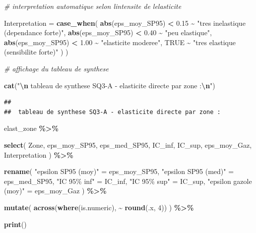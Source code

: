 \documentclass[
]{article}
\newenvironment{Shaded}{\begin{snugshade}}{\end{snugshade}}
\newcommand{\AttributeTok}[1]{\textcolor[rgb]{0.13,0.29,0.53}{#1}}
\newcommand{\CommentTok}[1]{\textcolor[rgb]{0.56,0.35,0.01}{\textit{#1}}}
\newcommand{\ConstantTok}[1]{\textcolor[rgb]{0.56,0.35,0.01}{#1}}
\newcommand{\DecValTok}[1]{\textcolor[rgb]{0.00,0.00,0.81}{#1}}
\newcommand{\FloatTok}[1]{\textcolor[rgb]{0.00,0.00,0.81}{#1}}
\newcommand{\FunctionTok}[1]{\textcolor[rgb]{0.13,0.29,0.53}{\textbf{#1}}}
\newcommand{\NormalTok}[1]{#1}
\newcommand{\OtherTok}[1]{\textcolor[rgb]{0.56,0.35,0.01}{#1}}
\newcommand{\SpecialCharTok}[1]{\textcolor[rgb]{0.81,0.36,0.00}{\textbf{#1}}}
\newcommand{\StringTok}[1]{\textcolor[rgb]{0.31,0.60,0.02}{#1}}
\begin{document}
\begin{Shaded}
\begin{Highlighting}[]
    \CommentTok{\# interpretation automatique selon l\textquotesingle{}intensite de l\textquotesingle{}elasticite}

    \AttributeTok{Interpretation =} \FunctionTok{case\_when}\NormalTok{(}
      \FunctionTok{abs}\NormalTok{(eps\_moy\_SP95) }\SpecialCharTok{\textless{}} \FloatTok{0.15} \SpecialCharTok{\textasciitilde{}} \StringTok{"tres inelastique (dependance forte)"}\NormalTok{,}
      \FunctionTok{abs}\NormalTok{(eps\_moy\_SP95) }\SpecialCharTok{\textless{}} \FloatTok{0.40} \SpecialCharTok{\textasciitilde{}} \StringTok{"peu elastique"}\NormalTok{,}
      \FunctionTok{abs}\NormalTok{(eps\_moy\_SP95) }\SpecialCharTok{\textless{}} \FloatTok{1.00} \SpecialCharTok{\textasciitilde{}} \StringTok{"elasticite moderee"}\NormalTok{,}
      \ConstantTok{TRUE} \SpecialCharTok{\textasciitilde{}} \StringTok{"tres elastique (sensibilite forte)"}
\NormalTok{    )}
\NormalTok{  )}


\CommentTok{\# affichage du tableau de synthese}

\FunctionTok{cat}\NormalTok{(}\StringTok{"}\SpecialCharTok{\textbackslash{}n}\StringTok{ tableau de synthese SQ3{-}A {-} elasticite directe par zone :}\SpecialCharTok{\textbackslash{}n}\StringTok{"}\NormalTok{)}
\end{Highlighting}
\end{Shaded}

\begin{verbatim}
## 
##  tableau de synthese SQ3-A - elasticite directe par zone :
\end{verbatim}

\begin{Shaded}
\begin{Highlighting}[]
\NormalTok{elast\_zone }\SpecialCharTok{\%\textgreater{}\%}

  \FunctionTok{select}\NormalTok{(}
\NormalTok{    Zone,}
\NormalTok{    eps\_moy\_SP95,}
\NormalTok{    eps\_med\_SP95,}
\NormalTok{    IC\_inf,}
\NormalTok{    IC\_sup,}
\NormalTok{    eps\_moy\_Gaz,}
\NormalTok{    Interpretation}
\NormalTok{  ) }\SpecialCharTok{\%\textgreater{}\%}

  \FunctionTok{rename}\NormalTok{(}
    \StringTok{"epsilon SP95 (moy)"} \OtherTok{=}\NormalTok{ eps\_moy\_SP95,}
    \StringTok{"epsilon SP95 (med)"} \OtherTok{=}\NormalTok{ eps\_med\_SP95,}
    \StringTok{"IC 95\% inf"} \OtherTok{=}\NormalTok{ IC\_inf,}
    \StringTok{"IC 95\% sup"} \OtherTok{=}\NormalTok{ IC\_sup,}
    \StringTok{"epsilon gazole (moy)"} \OtherTok{=}\NormalTok{ eps\_moy\_Gaz}
\NormalTok{  ) }\SpecialCharTok{\%\textgreater{}\%}

  \FunctionTok{mutate}\NormalTok{(}
    \FunctionTok{across}\NormalTok{(}\FunctionTok{where}\NormalTok{(is.numeric), }\SpecialCharTok{\textasciitilde{}} \FunctionTok{round}\NormalTok{(.x, }\DecValTok{4}\NormalTok{))}
\NormalTok{  ) }\SpecialCharTok{\%\textgreater{}\%}

  \FunctionTok{print}\NormalTok{()}
\end{Highlighting}
\end{Shaded}
\end{document}
